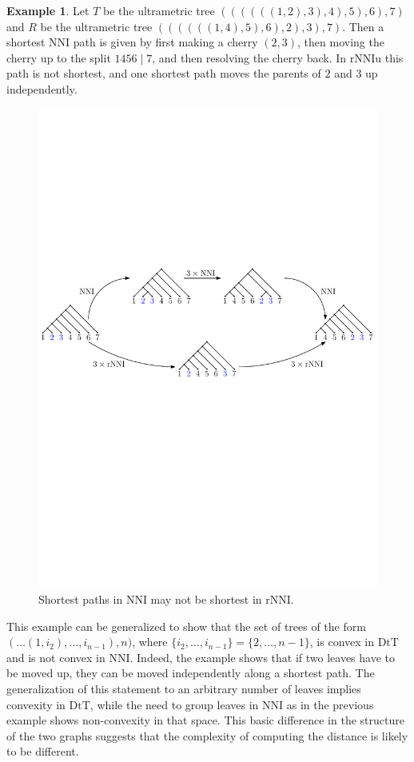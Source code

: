 \documentclass{amsart}
\theoremstyle{definition}
\newtheorem{example}[lemma]{Example}
\newcommand{\nni}{\mathrm{NNI}}
\newcommand{\rnni}{\mathrm{rNNI}}
\newcommand{\rnniu}{\mathrm{rNNIu}}
\newcommand{\dtt}{\mathrm{DtT}}
\begin{document}
\begin{example}
Let $T$ be the ultrametric tree $((((((1, 2), 3), 4), 5), 6), 7)$ and $R$ be the ultrametric tree $((((((1, 4), 5), 6), 2), 3), 7)$.
Then a shortest $\nni$ path is given by first making a cherry $(2,3)$, then moving the cherry up to the split $1456 \mid 7$, and then resolving the cherry back.
In $\rnniu$ this path is not shortest, and one shortest path moves the parents of $2$ and $3$ up independently.

\begin{figure}[ht]
\centering
\includegraphics[width=\textwidth]{NNI_VS_rNNI.pdf}
\caption{Shortest paths in $\nni$ may not be shortest in $\rnni$.}
\label{NNI_VS_rNNI.pdf}
\end{figure}
\end{example}

This example can be generalized to show that the set of trees of the form $(\ldots(1, i_2), \ldots, i_{n-1}), n)$, where $\{i_2, \ldots, i_{n-1}\} = \{2, \ldots, n-1\}$, is convex in $\dtt$ and is not convex in $\nni$.
Indeed, the example shows that if two leaves have to be moved up, they can be moved independently along a shortest path.
The generalization of this statement to an arbitrary number of leaves implies convexity in $\dtt$, while the need to group leaves in $\nni$ as in the previous example shows non-convexity in that space.
This basic difference in the structure of the two graphs suggests that the complexity of computing the distance is likely to be different.
\end{document}
